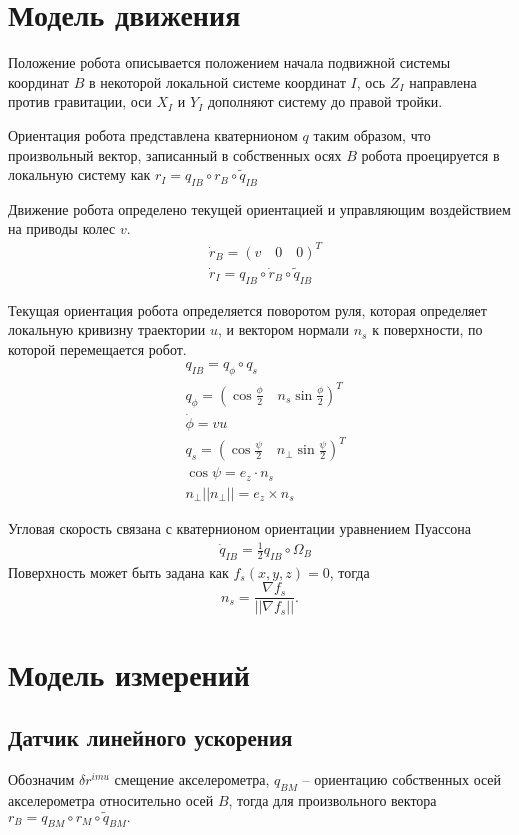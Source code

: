 \documentclass[a4paper,12pt]{article}
\begin{document}
\section{Модель движения}

Положение робота описывается положением начала подвижной системы координат $B$ в некоторой локальной системе координат $I$, ось $Z_I$ направлена против гравитации, оси $X_I$ и $Y_I$ дополняют систему до правой тройки.

Ориентация робота представлена кватернионом $q$ таким образом, что произвольный вектор, записанный в собственных осях $B$ робота проецируется в локальную систему как
$r_I = q_{IB} \circ r_B \circ \tilde{q}_{IB}$

Движение робота определено текущей ориентацией и управляющим воздействием на приводы колес $v$.
\begin{align} \label{eq:model_velocity}
&\dot{r}_B = (v \quad 0 \quad 0)^T \\
&\dot{r}_I = q_{IB} \circ \dot{r}_B \circ \tilde{q}_{IB}
\end{align}

Текущая ориентация робота определяется поворотом руля, которая определяет локальную кривизну траектории $u$, и вектором нормали $n_s$ к поверхности, по которой перемещается робот.
\begin{align} 
&q_{IB} = q_{\phi} \circ q_{s} \\
&q_{\phi} = (\cos{\frac{\phi}{2}} \quad n_{s}\sin{\frac{\phi}{2}})^T \\
&\dot{\phi} = vu \\
&q_{s} = (\cos{\frac{\psi}{2}} \quad n_{\perp}\sin{\frac{\psi}{2}})^T \\
&\cos{\psi} = e_z \cdot n_s \\
& n_{\perp} ||n_{\perp}|| = e_z \times n_s 
\end{align}

Угловая скорость связана с кватернионом ориентации уравнением Пуассона
\begin{align}  \label{eq:model_rot_velocity}
&\dot{q}_{IB} = \frac{1}{2} q_{IB} \circ \Omega_{B}
\end{align}
Поверхность может быть задана как $f_s(x,y,z) = 0$,
тогда 
$$n_s = \frac{\nabla f_s}{||\nabla f_s||}.$$


\section{Модель измерений}
	
\subsection{Датчик линейного ускорения}
Обозначим $\delta r^{imu}$ смещение акселерометра,  $q_{BM}$ -- ориентацию собственных осей акселерометра относительно осей $B$, тогда для произвольного вектора
$r_B = q_{BM} \circ r_M \circ \tilde{q}_{BM}.$
\end{document}
